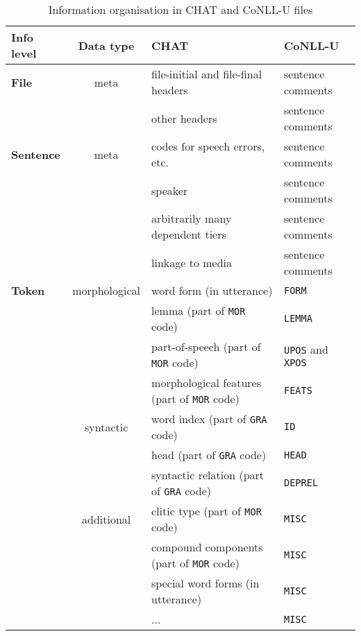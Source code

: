 \begin{table}[h!]
\caption {Information organisation in CHAT and CoNLL-U files} \label{tab:grmap}
\centering
\begin{tabularx}{\widefigurewidth}{@{}lcXX@{}}
\toprule
\textbf{Info level}          & \textbf{Data type} & \textbf{CHAT} & \textbf{CoNLL-U}\\ \midrule
\textbf{File}           & meta          & file-initial and file-final headers & sentence comments\\
                        &               & other headers & sentence comments\\\addlinespace\addlinespace
\textbf{Sentence}       & meta          & codes for speech errors, etc.& sentence comments\\
                        &               & speaker & sentence comments\\
                        &               & arbitrarily many dependent tiers & sentence comments\\
                        &               & linkage to media & sentence comments\\\addlinespace\addlinespace
\textbf{Token}          & morphological & word form (in utterance)& \texttt{FORM}\\
                        &               & lemma (part of \texttt{MOR} code)& \texttt{LEMMA}\\
                        &               & part-of-speech (part of \texttt{MOR} code)& \texttt{UPOS} and \texttt{XPOS}\\
                        &               & morphological features (part of \texttt{MOR} code)& \texttt{FEATS}\\\addlinespace
                        & syntactic     & word index (part of \texttt{GRA} code)& \texttt{ID}\\
                        &               & head (part of \texttt{GRA} code)& \texttt{HEAD}\\
                        &               & syntactic relation (part of \texttt{GRA} code)& \texttt{DEPREL}\\\addlinespace
                        & additional    & clitic type (part of \texttt{MOR} code)& \texttt{MISC}\\
                        &               & compound components (part of \texttt{MOR} code)& \texttt{MISC}\\
                        &               & special word forms (in utterance)& \texttt{MISC}\\
                        &               & ... & \texttt{MISC}\\\bottomrule
\end{tabularx}
\end{table}

